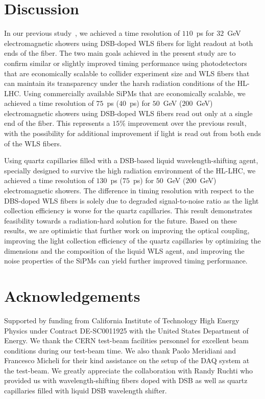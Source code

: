 \documentclass[preprint,1p]{elsarticle}
\begin{document}
  
%
%
  
%
%

\section{Discussion} 
In our previous study~\cite{Anderson:2015gha}, we achieved
a time resolution of $110$~ps for $32$~GeV electromagnetic showers using
DSB-doped WLS fibers for light readout at both ends of the fiber. The two main
goals achieved in the present study are to confirm similar or slightly improved
timing performance using photodetectors that are economically scalable to
collider experiment size and WLS fibers that can maintain its transparency under
the harsh radiation conditions of the HL-LHC. Using commercially available SiPMs
that are economically scalable, we achieved a time resolution of $75$~ps
($40$~ps) for $50$~GeV ($200$~GeV) electromagnetic showers using DSB-doped WLS
fibers read out only at a single end of the fiber. This represents a $15\%$
improvement over the previous result, with the possibility for additional
improvement if light is read out from both ends of the WLS fibers. 

Using quartz capillaries filled with a DSB-based liquid wavelength-shifting
agent, specially designed to survive the high radiation environment of the
HL-LHC, we achieved a time resolution of $130$~ps ($75$~ps) for $50$~GeV
($200$~GeV) electromagnetic showers. The difference in timing resolution with
respect to the DBS-doped WLS fibers is solely due to degraded signal-to-noise
ratio as the light collection efficiency is worse for the quartz capillaries.
This result demonstrates feasibility towards a radiation-hard solution for the
future. Based on these results, we are optimistic that further work on improving
the optical coupling, improving the light collection efficiency of the quartz
capillaries by optimizing the dimensions and the composition of the liquid WLS
agent, and improving the noise properties of the SiPMs can yield further
improved timing performance. 

  
%
%

\section{Acknowledgements} 
Supported by funding from California Institute of
Technology High Energy Physics under Contract DE-SC0011925 with the United
States Department of Energy. We thank the CERN test-beam facilities personnel for
excellent beam conditions during our test-beam time. We also thank Paolo
Meridiani and Francesco Micheli for their kind assistance on the setup of the
DAQ system at the test-beam. We greatly appreciate the collaboration with Randy
Ruchti who provided us with wavelength-shifting fibers doped with DSB as well as
quartz capillaries filled with liquid DSB wavelength shifter.
%
%


{}
 
\end{document}
